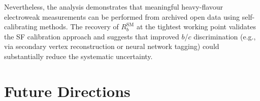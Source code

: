 \documentclass[11pt,a4paper]{article}
\begin{document}
Nevertheless, the analysis demonstrates that meaningful
heavy-flavour electroweak measurements can be performed from
archived open data using self-calibrating methods.
The recovery of $R_b^\text{SM}$ at the tightest working point
validates the SF calibration approach and suggests that improved
$b$/$c$ discrimination (e.g., via secondary vertex
reconstruction or neural network tagging) could substantially
reduce the systematic uncertainty.

\section{Future Directions}
\label{sec:future}
\end{document}
